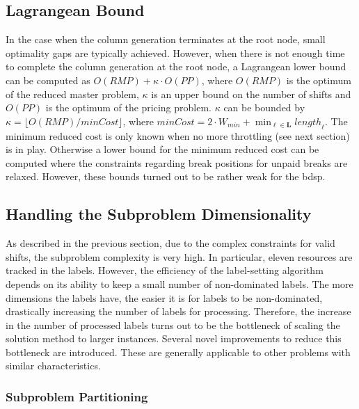 \documentclass[]{amsart}
\theoremstyle{plain}
\begin{document}
\subsection{Lagrangean Bound}

In the case when the column generation terminates at the root node, small optimality gaps are typically achieved. However, when there is not enough time to complete the column generation at the root node, a Lagrangean lower bound can be computed as $O(\mathit{RMP})+\kappa\cdot O(\mathit{PP})$, where $O(\mathit{RMP})$ is the optimum of the reduced master problem, $\kappa$ is an upper bound on the number of shifts and $O(PP)$ is the optimum of the pricing problem. $\kappa$ can be bounded by $\kappa=\lfloor O(\mathit{RMP})/\mathit{minCost}\rfloor$,
where $\mathit{minCost}=2\cdot W_{min}+\min_{\ell\in\mathbf{L}}{\mathit{length}_\ell}$. The minimum reduced cost is only known when no more throttling (see next section) is in play. Otherwise a lower bound for the minimum reduced cost can be computed where the constraints regarding break positions for unpaid breaks are relaxed. However, these bounds turned out to be rather weak for the \gls{bdsp}.

\subsection{Handling the Subproblem Dimensionality}

As described in the previous section, due to the complex constraints for valid shifts, the subproblem complexity is very high. In particular, eleven resources are tracked in the labels. However, the efficiency of the label-setting algorithm depends on its ability to keep a small number of non-dominated labels. The more dimensions the labels have, the easier it is for labels to be non-dominated, drastically increasing the number of labels for processing. Therefore, the increase in the number of processed labels turns out to be the bottleneck of scaling the solution method to larger instances. Several novel improvements to reduce this bottleneck are introduced. These are generally applicable to other problems with similar characteristics.

\subsubsection{Subproblem Partitioning}
\end{document}
